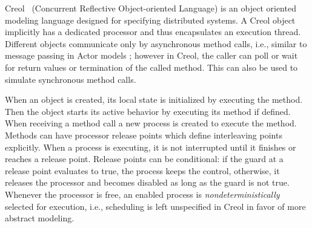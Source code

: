 

Creol~\cite{creol:broch_owe} (Concurrent Reflective Object-oriented Language) is
an object oriented modeling language designed for specifying distributed
systems. A Creol object implicitly has a dedicated processor and thus
encapsulates an execution thread. Different objects communicate only by
asynchronous method calls, i.e., similar to message passing in Actor models
\cite{actors:agha};  however in Creol, the caller can poll or wait for return
values or termination of the called method. This can also be used to simulate
synchronous method calls. %

When an object is created, its local state is initialized by executing the  method.
Then the object starts its active behavior by executing its
 method if defined. %
When receiving a method call a new process is created to execute the method. 
Methods can have processor release points which define interleaving points explicitly.
When a process is executing, it is not interrupted until it finishes or reaches a release point.
Release points can be conditional:
if the guard at a release point evaluates to true, the
process keeps the control, otherwise, it releases the processor and becomes
disabled as long as the guard is not true. Whenever the processor is free, an
enabled process is {\em nondeterministically} selected for execution, i.e.,
scheduling is left unspecified in Creol in favor of more abstract modeling.


